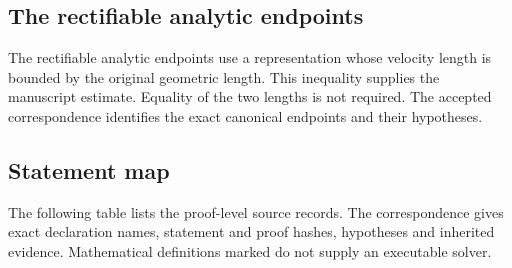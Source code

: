 \subsection{The rectifiable analytic endpoints}

The rectifiable analytic endpoints use a representation whose velocity length is bounded by the original geometric length. This inequality supplies the manuscript estimate. Equality of the two lengths is not required. The accepted correspondence identifies the exact canonical endpoints and their hypotheses.

\subsection{Statement map}

The following table lists the proof-level source records. The correspondence gives exact declaration names, statement and proof hashes, hypotheses and inherited evidence. Mathematical definitions marked  do not supply an executable solver.

